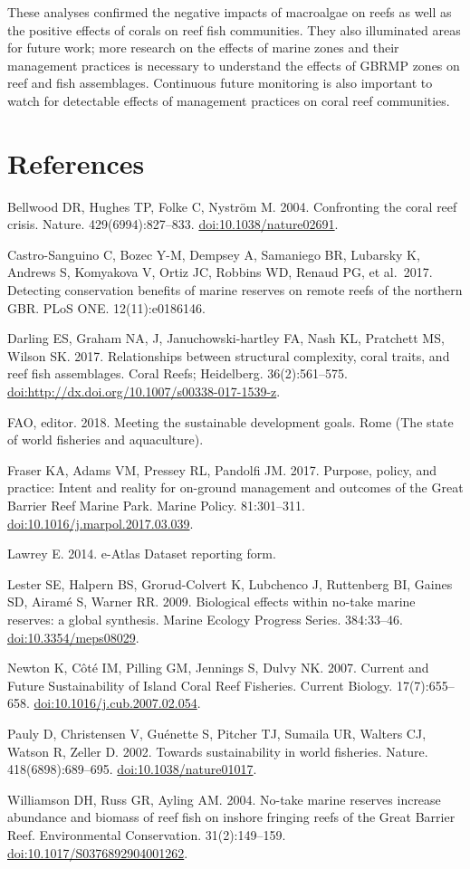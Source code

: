\documentclass[12pt,]{article}
\begin{document}
These analyses confirmed the negative impacts of macroalgae on reefs as
well as the positive effects of corals on reef fish communities. They
also illuminated areas for future work; more research on the effects of
marine zones and their management practices is necessary to understand
the effects of GBRMP zones on reef and fish assemblages. Continuous
future monitoring is also important to watch for detectable effects of
management practices on coral reef communities.

\newpage

\hypertarget{references}{%
\section{References}\label{references}}

Bellwood DR, Hughes TP, Folke C, Nyström M. 2004. Confronting the coral
reef crisis. Nature. 429(6994):827--833. \url{doi:10.1038/nature02691}.

Castro-Sanguino C, Bozec Y-M, Dempsey A, Samaniego BR, Lubarsky K,
Andrews S, Komyakova V, Ortiz JC, Robbins WD, Renaud PG, et al.~2017.
Detecting conservation benefits of marine reserves on remote reefs of
the northern GBR. PLoS ONE. 12(11):e0186146.

Darling ES, Graham NA, J, Januchowski-hartley FA, Nash KL, Pratchett MS,
Wilson SK. 2017. Relationships between structural complexity, coral
traits, and reef fish assemblages. Coral Reefs; Heidelberg.
36(2):561--575. \url{doi:http://dx.doi.org/10.1007/s00338-017-1539-z}.

FAO, editor. 2018. Meeting the sustainable development goals. Rome (The
state of world fisheries and aquaculture).

Fraser KA, Adams VM, Pressey RL, Pandolfi JM. 2017. Purpose, policy, and
practice: Intent and reality for on-ground management and outcomes of
the Great Barrier Reef Marine Park. Marine Policy. 81:301--311.
\url{doi:10.1016/j.marpol.2017.03.039}.

Lawrey E. 2014. e-Atlas Dataset reporting form.

Lester SE, Halpern BS, Grorud-Colvert K, Lubchenco J, Ruttenberg BI,
Gaines SD, Airamé S, Warner RR. 2009. Biological effects within no-take
marine reserves: a global synthesis. Marine Ecology Progress Series.
384:33--46. \url{doi:10.3354/meps08029}.

Newton K, Côté IM, Pilling GM, Jennings S, Dulvy NK. 2007. Current and
Future Sustainability of Island Coral Reef Fisheries. Current Biology.
17(7):655--658. \url{doi:10.1016/j.cub.2007.02.054}.

Pauly D, Christensen V, Guénette S, Pitcher TJ, Sumaila UR, Walters CJ,
Watson R, Zeller D. 2002. Towards sustainability in world fisheries.
Nature. 418(6898):689--695. \url{doi:10.1038/nature01017}.

Williamson DH, Russ GR, Ayling AM. 2004. No-take marine reserves
increase abundance and biomass of reef fish on inshore fringing reefs of
the Great Barrier Reef. Environmental Conservation. 31(2):149--159.
\url{doi:10.1017/S0376892904001262}.
\end{document}
